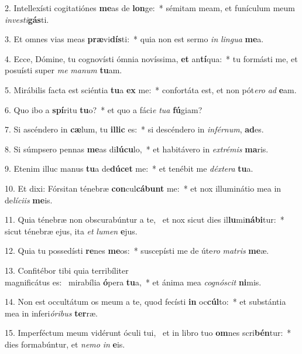 	2. Intellexísti cogitatiónes \textbf{me}as de \textbf{lon}ge:~* sémitam meam, et funículum meum\\ \textit{in}\textit{ves}\textit{ti}\textbf{gás}ti.

	3. Et omnes vias meas \textbf{præ}vi\textbf{dís}ti:~* quia non est sermo \textit{in} \textit{lin}\textit{gua} \textbf{me}a.

	4. Ecce, Dómine, tu cognovísti ómnia novíssima, \textbf{et} an\textbf{tí}qua:~* tu formásti me, et posuísti super \textit{me} \textit{ma}\textit{num} \textbf{tu}am.

	5. Mirábilis facta est sciéntia \textbf{tu}a \textbf{ex} me:~* confortáta est, et non pót\textit{e}\textit{ro} \textit{ad} \textbf{e}am.

	6. Quo ibo a \textbf{spí}ritu \textbf{tu}o?~* et quo a fáci\textit{e} \textit{tu}\textit{a} \textbf{fú}giam?

	7. Si ascéndero in \textbf{cæ}lum, tu \textbf{il}\textbf{lic} es:~* si descéndero in \textit{in}\textit{fér}\textit{num}, \textbf{ad}es.

	8. Si súmpsero pennas \textbf{me}as di\textbf{lú}\textbf{cu}lo,~* et habitávero in \textit{ex}\textit{tré}\textit{mis} \textbf{ma}ris.

	9. Etenim illuc manus \textbf{tu}a de\textbf{dú}\textbf{cet} me:~* et tenébit me \textit{déx}\textit{te}\textit{ra} \textbf{tu}a.

	10. Et dixi: Fórsitan ténebræ \textbf{con}cul\textbf{cá}\textbf{bunt} me:~* et nox illuminátio mea in de\textit{lí}\textit{ci}\textit{is} \textbf{me}is.

	11. Quia ténebræ non obscurabúntur a te,~{\color{red}\GreDagger} et nox sicut dies il\textbf{lu}mi\textbf{ná}\textbf{bi}tur:~* sicut ténebræ ejus, ita \textit{et} \textit{lu}\textit{men} \textbf{e}jus.

	12. Quia tu possedísti \textbf{re}nes \textbf{me}os:~* suscepísti me de úte\textit{ro} \textit{ma}\textit{tris} \textbf{me}æ.

	13. Confitébor tibi quia terribíliter\\ magnificátus es:~{\color{red}\GreDagger} mirabília \textbf{ó}pera \textbf{tu}a,~* et ánima mea \textit{co}\textit{gnó}\textit{scit} \textbf{ni}mis.

	14. Non est occultátum os meum a te, quod fecísti \textbf{in} oc\textbf{cúl}to:~* et substántia mea in inferi\textit{ó}\textit{ri}\textit{bus} \textbf{ter}ræ.

	15. Imperféctum meum vidérunt óculi tui,~{\color{red}\GreDagger} et in libro tuo \textbf{om}nes scri\textbf{bén}tur:~* dies formabúntur, et \textit{ne}\textit{mo} \textit{in} \textbf{e}is.

